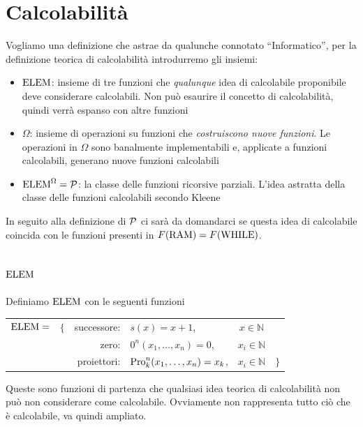 \section{Calcolabilità}
Vogliamo una definizione che astrae da qualunche connotato ``Informatico'', per la definizione teorica di calcolabilità introdurremo gli insiemi:
\begin{itemize} 
	\item \textbf{$\text{ELEM}$}: insieme di tre funzioni che \textit{qualunque} idea di calcolabile proponibile deve considerare calcolabili. Non può esaurire il concetto di calcolabilità, quindi verrà espanso con altre funzioni
	
	\item $\Omega$: insieme di operazioni su funzioni che \textit{costruiscono nuove funzioni}. Le operazioni in $\Omega$ sono banalmente implementabili e, applicate a funzioni calcolabili, generano nuove funzioni calcolabili
	
	\item \textbf{$\text{ELEM}^\Omega = \mathcal{P}$}: la classe delle funzioni ricorsive parziali. L'idea astratta della classe delle funzioni calcolabili secondo Kleene
\end{itemize}

In seguito alla definizione di $\mathcal{P}$ ci sarà da domandarci se questa idea di calcolabile coincida con le funzioni presenti in $F(\text{RAM}) = F(\text{WHILE})$.

\subsection{$\text{ELEM}$}
Definiamo $\text{ELEM}$ con le seguenti funzioni
\begin{center}
	\begin{tabular}{r c r l c l}
		$\text{ELEM} = $ & $\{$ & successore: & $s(x) = x + 1$, & $x \in \mathbb{N}$ & \\
		&& zero: & $0^n (x_1, \dots, x_n) = 0$, & $x_i \in \mathbb{N}$ & \\
		&& proiettori: & $\text{Pro}_k^n (x_1, \dots, x_n) = x_k$, & $x_i \in \mathbb{N}$& $\}$ \\
	\end{tabular}
\end{center}

Queste sono funzioni di partenza che qualsiasi idea teorica di calcolabilità non può non considerare come calcolabile. Ovviamente non rappresenta tutto ciò che è calcolabile, va quindi ampliato. 

